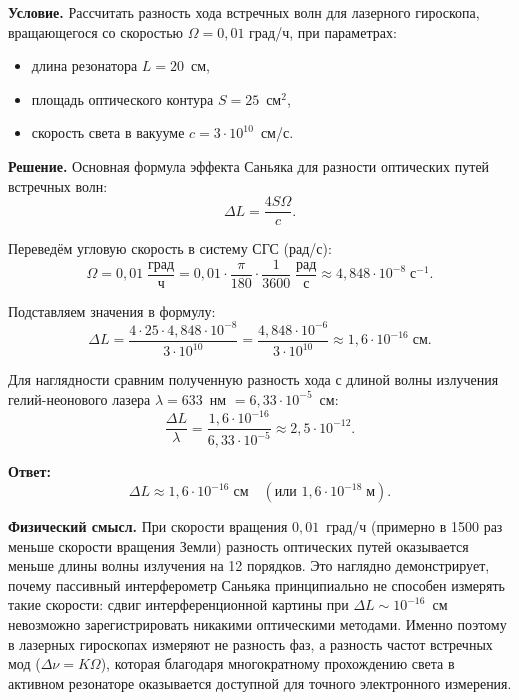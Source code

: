 \documentclass[12pt, a4paper]{article}
\begin{document}
\textbf{Условие.} Рассчитать разность хода встречных волн для лазерного гироскопа, вращающегося со скоростью $\Omega = 0{,}01$ град/ч, при параметрах:
\begin{itemize}[leftmargin=1.5em]
    \item длина резонатора $L = 20$~см,
    \item площадь оптического контура $S = 25$~см$^2$,
    \item скорость света в вакууме $c = 3 \cdot 10^{10}$~см/с.
\end{itemize}

\textbf{Решение.} Основная формула эффекта Саньяка для разности оптических путей встречных волн:
\begin{equation}
    \Delta L = \frac{4S\Omega}{c}.
\end{equation}

Переведём угловую скорость в систему СГС (рад/с):
\begin{equation}
    \Omega = 0{,}01 \; \frac{\text{град}}{\text{ч}} = 0{,}01 \cdot \frac{\pi}{180} \cdot \frac{1}{3600} \; \frac{\text{рад}}{\text{с}} \approx 4{,}848 \cdot 10^{-8} \; \text{с}^{-1}.
\end{equation}

Подставляем значения в формулу:
\begin{equation}
    \Delta L = \frac{4 \cdot 25 \cdot 4{,}848 \cdot 10^{-8}}{3 \cdot 10^{10}} = \frac{4{,}848 \cdot 10^{-6}}{3 \cdot 10^{10}} \approx 1{,}6 \cdot 10^{-16} \; \text{см}.
\end{equation}

Для наглядности сравним полученную разность хода с длиной волны излучения гелий-неонового лазера $\lambda = 633$~нм $= 6{,}33 \cdot 10^{-5}$~см:
\begin{equation}
    \frac{\Delta L}{\lambda} = \frac{1{,}6 \cdot 10^{-16}}{6{,}33 \cdot 10^{-5}} \approx 2{,}5 \cdot 10^{-12}.
\end{equation}

\textbf{Ответ:}
\[
    \boxed{\Delta L \approx 1{,}6 \cdot 10^{-16} \; \text{см} \quad \left(\text{или } 1{,}6 \cdot 10^{-18} \; \text{м}\right).}
\]

\textbf{Физический смысл.} При скорости вращения $0{,}01$~град/ч (примерно в 1500 раз меньше скорости вращения Земли) разность оптических путей оказывается меньше длины волны излучения на 12 порядков. Это наглядно демонстрирует, почему пассивный интерферометр Саньяка принципиально не способен измерять такие скорости: сдвиг интерференционной картины при $\Delta L \sim 10^{-16}$~см невозможно зарегистрировать никакими оптическими методами. Именно поэтому в лазерных гироскопах измеряют не разность фаз, а разность частот встречных мод ($\Delta \nu = K\Omega$), которая благодаря многократному прохождению света в активном резонаторе оказывается доступной для точного электронного измерения.
\end{document}
